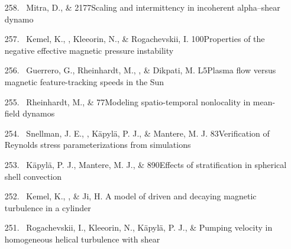 \begin{itemize}
\item[{258.}~]
Mitra, D., \& \Brandenburg{}
{2177}{Scaling and intermittency in incoherent alpha--shear dynamo}

\item[{257.}~]
Kemel, K., \Brandenburg, Kleeorin, N., \& Rogachevskii, I.
{100}{Properties of the negative effective magnetic pressure instability}

\item[{256.}~]
Guerrero, G., Rheinhardt, M., \Brandenburg, \& Dikpati, M.
{L5}{Plasma flow versus magnetic feature-tracking speeds in the Sun}

\item[{255.}~]
Rheinhardt, M., \& \Brandenburg{}
{77}{Modeling spatio-temporal nonlocality in mean-field dynamos}

\item[{254.}~]
Snellman, J. E., \Brandenburg, K\"apyl\"a, P. J., \& Mantere, M. J.
{83}{Verification of Reynolds stress parameterizations from simulations}

\item[{253.}~]
K\"apyl\"a, P. J., Mantere, M. J., \& \Brandenburg{}
{890}{Effects of stratification in spherical shell convection}

\item[{252.}~]
Kemel, K., \Brandenburg, \& Ji, H.
{A model of driven and decaying magnetic turbulence in a cylinder}

\item[{251.}~]
Rogachevskii, I., Kleeorin, N., K\"apyl\"a, P. J., \& \Brandenburg{}
{Pumping velocity in homogeneous helical turbulence with shear}


\end{itemize}
